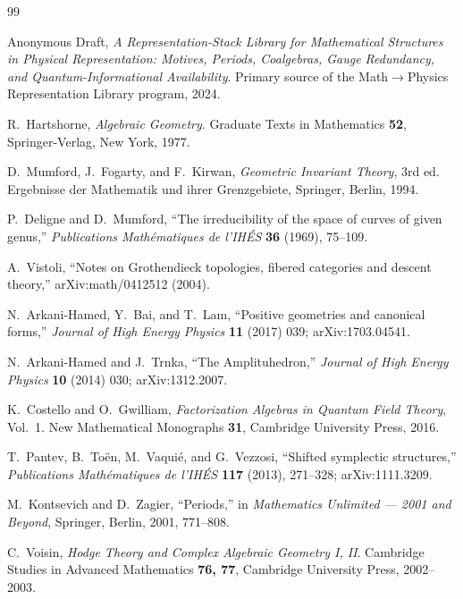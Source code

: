 \documentclass[12pt]{article}
\theoremstyle{definition}
\theoremstyle{remark}
\begin{document}
\begin{thebibliography}{99}

Anonymous Draft,
\emph{A Representation-Stack Library for Mathematical Structures in Physical Representation: Motives,
Periods, Coalgebras, Gauge Redundancy, and Quantum-Informational Availability}.
Primary source of the Math$\to$Physics Representation Library program, 2024.

R.~Hartshorne,
\emph{Algebraic Geometry}.
Graduate Texts in Mathematics \textbf{52}, Springer-Verlag, New York, 1977.

D.~Mumford, J.~Fogarty, and F.~Kirwan,
\emph{Geometric Invariant Theory}, 3rd ed.
Ergebnisse der Mathematik und ihrer Grenzgebiete, Springer, Berlin, 1994.

P.~Deligne and D.~Mumford,
``The irreducibility of the space of curves of given genus,''
\emph{Publications Math\'ematiques de l'IH\'ES} \textbf{36} (1969), 75--109.

A.~Vistoli,
``Notes on Grothendieck topologies, fibered categories and descent theory,''
arXiv:math/0412512 (2004).

N.~Arkani-Hamed, Y.~Bai, and T.~Lam,
``Positive geometries and canonical forms,''
\emph{Journal of High Energy Physics} \textbf{11} (2017) 039; arXiv:1703.04541.

N.~Arkani-Hamed and J.~Trnka,
``The Amplituhedron,''
\emph{Journal of High Energy Physics} \textbf{10} (2014) 030; arXiv:1312.2007.

K.~Costello and O.~Gwilliam,
\emph{Factorization Algebras in Quantum Field Theory}, Vol.~1.
New Mathematical Monographs \textbf{31}, Cambridge University Press, 2016.

T.~Pantev, B.~To\"en, M.~Vaqui\'e, and G.~Vezzosi,
``Shifted symplectic structures,''
\emph{Publications Math\'ematiques de l'IH\'ES} \textbf{117} (2013), 271--328; arXiv:1111.3209.

M.~Kontsevich and D.~Zagier,
``Periods,''
in \emph{Mathematics Unlimited --- 2001 and Beyond}, Springer, Berlin, 2001, 771--808.

C.~Voisin,
\emph{Hodge Theory and Complex Algebraic Geometry I, II}.
Cambridge Studies in Advanced Mathematics \textbf{76, 77}, Cambridge University Press, 2002--2003.


\end{thebibliography}
\end{document}
